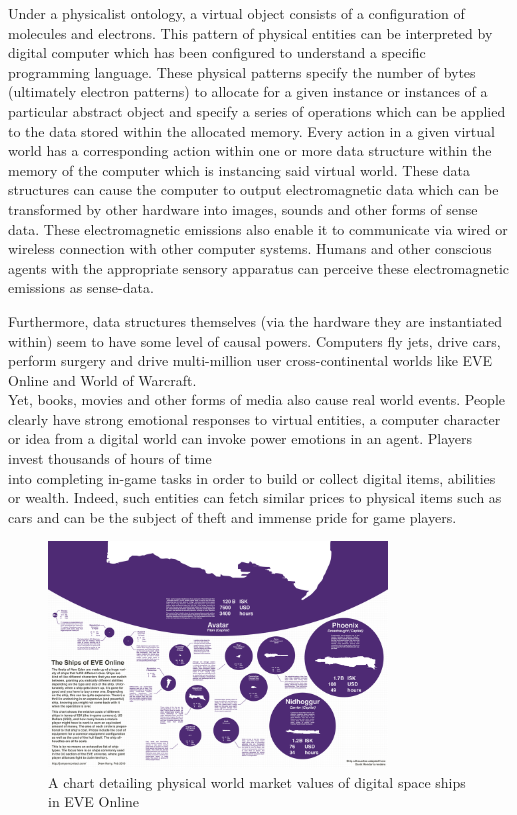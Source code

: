   Under a physicalist ontology, a virtual object consists of a configuration of molecules and electrons. This pattern of physical entities can be interpreted by digital computer which has been configured to understand a specific programming language. These physical patterns specify the number of bytes (ultimately electron patterns) to allocate for a given instance or instances of a particular abstract object and specify a series of operations which can be applied to the data stored within the allocated memory. Every action in a given virtual world has a corresponding action within one or more data structure within the memory of the computer which is instancing said virtual world. These data structures can cause the computer to output electromagnetic data which can be transformed by other hardware into images, sounds and other forms of sense data. These electromagnetic emissions also enable it to communicate via wired or wireless connection with other computer systems. Humans and other conscious agents with the appropriate sensory apparatus can perceive these electromagnetic emissions as sense-data.
  \newline
  
  
 Furthermore, data structures themselves (via the hardware they are instantiated within) seem to have some level of causal powers. Computers fly jets, drive cars, perform surgery and drive multi-million user cross-continental worlds like EVE Online and World of Warcraft. \\
 Yet, books, movies and other forms of media also cause real world events. People clearly have strong emotional responses to virtual entities, a computer character or idea from a digital world can invoke power emotions in an agent. Players invest thousands of hours of time \\
 into completing in-game tasks in order to build or collect digital items, abilities or wealth. Indeed, such entities can fetch similar prices to physical items such as cars and can be the subject of theft and immense pride for game players. \cite{EVEArticle}
 
 
 
 \begin{figure}[ht!]
 	\centering
 	\includegraphics[width=90mm]{4339410221_12d667f5b1_o.png}
 	\caption{A chart detailing physical world market values of digital space ships in EVE Online \label{overflow}}
 	\label{fig:FF7}
 \end{figure}
 
